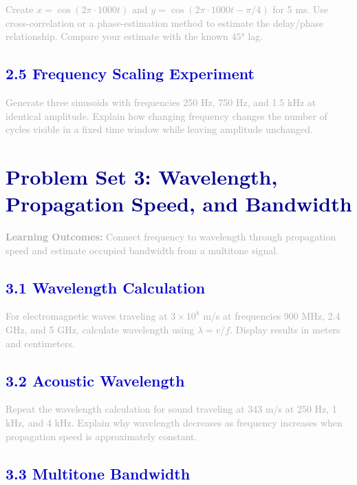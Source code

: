\documentclass[12pt,a4paper]{article}
\begin{document}
\textcolor{darkgray}{
Create $x = \cos(2\pi \cdot 1000t)$ and $y = \cos(2\pi \cdot 1000t - \pi/4)$ for 5 ms. Use cross-correlation or a phase-estimation method to estimate the delay/phase relationship. Compare your estimate with the known $45°$ lag.
}

\subsection*{\large\textbf{\textcolor{mediumblue}{2.5 Frequency Scaling Experiment}}}

\textcolor{darkgray}{
Generate three sinusoids with frequencies 250 Hz, 750 Hz, and 1.5 kHz at identical amplitude. Explain how changing frequency changes the number of cycles visible in a fixed time window while leaving amplitude unchanged.
}

\newpage

\section*{\LARGE\textbf{\textcolor{darkblue}{Problem Set 3: Wavelength, Propagation Speed, and Bandwidth}}}

\textcolor{darkgray}{\textbf{Learning Outcomes:} Connect frequency to wavelength through propagation speed and estimate occupied bandwidth from a multitone signal.}

\subsection*{\large\textbf{\textcolor{mediumblue}{3.1 Wavelength Calculation}}}

\textcolor{darkgray}{
For electromagnetic waves traveling at $3 \times 10^8$ m/s at frequencies 900 MHz, 2.4 GHz, and 5 GHz, calculate wavelength using $\lambda = v/f$. Display results in meters and centimeters.
}

\subsection*{\large\textbf{\textcolor{mediumblue}{3.2 Acoustic Wavelength}}}

\textcolor{darkgray}{
Repeat the wavelength calculation for sound traveling at 343 m/s at 250 Hz, 1 kHz, and 4 kHz. Explain why wavelength decreases as frequency increases when propagation speed is approximately constant.
}

\subsection*{\large\textbf{\textcolor{mediumblue}{3.3 Multitone Bandwidth}}}
\end{document}
